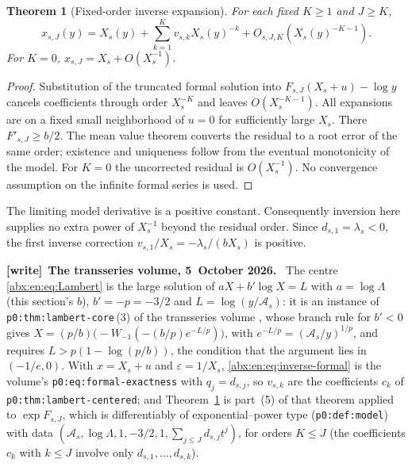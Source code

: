 \documentclass[11pt,letterpaper]{article}
\numberwithin{equation}{section}
\newtheorem{theorem}{Theorem}[section]
\theoremstyle{remark}\newtheorem{remark}[theorem]{Remark}
\newcommand{\eps}{\varepsilon}
\newenvironment{writenote}[1][]{\par\smallskip\begingroup\small
 \noindent\textbf{[write]}\if\relax\detokenize{#1}\relax\else~\textbf{#1.}\fi\ }%
 {\par\endgroup\smallskip}
\begin{document}
\begin{theorem}[Fixed-order inverse expansion]\label{abx:en:thm:inverse}
For each fixed $K\ge1$ and $J\ge K$,
\begin{equation}\label{abx:en:eq:inverse-exp}
 x_{s,J}(y)=X_s(y)+\sum_{k=1}^K v_{s,k}X_s(y)^{-k}
                 +O_{s,J,K}(X_s(y)^{-K-1}).
\end{equation}
For $K=0$, $x_{s,J}=X_s+O(X_s^{-1})$.
\end{theorem}
\begin{proof}
Substitution of the truncated formal solution into
$F_{s,J}(X_s+u)-\log y$ cancels coefficients through order
$X_s^{-K}$ and leaves $O(X_s^{-K-1})$. All expansions are on
a fixed small neighborhood of $u=0$ for sufficiently large $X_s$.
There $F'_{s,J}\ge b/2$. The mean value theorem converts the
residual to a root error of the same order; existence and uniqueness
follow from the eventual monotonicity of the model. For $K=0$ the
uncorrected residual is $O(X_s^{-1})$. No convergence assumption on
the infinite formal series is used.
\end{proof}
The limiting model derivative is a positive constant. Consequently
inversion here supplies no extra power of $X_s^{-1}$ beyond the
residual order. Since $d_{s,1}=\lambda_s<0$, the first inverse
correction $v_{s,1}/X_s=-\lambda_s/(bX_s)$ is positive.

\begin{writenote}[The transseries volume, 5~October 2026]
The centre \eqref{abx:en:eq:Lambert} is the large solution of $aX+b'\log X=L$ with $a=\log\Lambda$ (this section's $b$), $b'=-p=-3/2$ and $L=\log(y/\mathcal A_s)$: it is an instance of \texttt{p0:thm:lambert-core}\,(3) of the transseries volume \cite{TSvol}, whose branch rule for $b'<0$ gives $X=(p/b)\bigl(-W_{-1}(-(b/p)e^{-L/p})\bigr)$, with $e^{-L/p}=(\mathcal A_s/y)^{1/p}$, and requires $L>p(1-\log(p/b))$, the condition that the argument lies in $(-1/e,0)$. With $x=X_s+u$ and $\eps=1/X_s$, \eqref{abx:en:eq:inverse-formal} is the volume's \texttt{p0:eq:formal-exactness} with $q_j=d_{s,j}$, so $v_{s,k}$ are the coefficients $c_k$ of \texttt{p0:thm:lambert-centered}; and Theorem~\ref{abx:en:thm:inverse} is part~(5) of that theorem applied to $\exp F_{s,J}$, which is differentiably of exponential--power type (\texttt{p0:def:model}) with data $(\mathcal A_s,\log\Lambda,1,-3/2,1,\sum_{j\le J}d_{s,j}t^j)$, for orders $K\le J$ (the coefficients $c_k$ with $k\le J$ involve only $d_{s,1},\ldots,d_{s,k}$).
\end{writenote}
\end{document}
